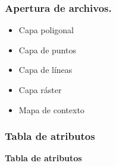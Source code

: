 \documentclass{beamer}
\begin{document}
\begin{frame}
	\frametitle{Apertura de archivos.}

	\begin{itemize}
		\item{Capa poligonal}
		\item{Capa de puntos}
		\item{Capa de líneas}
		\item{Capa ráster}
		\item{Mapa de contexto}
	\end{itemize}		
	
\end{frame}

\begin{frame}
	\frametitle{Tabla de atributos}

	\begin{center}
		\textbf{Tabla de atributos}
	\end{center}
	
\end{frame}
\end{document}
